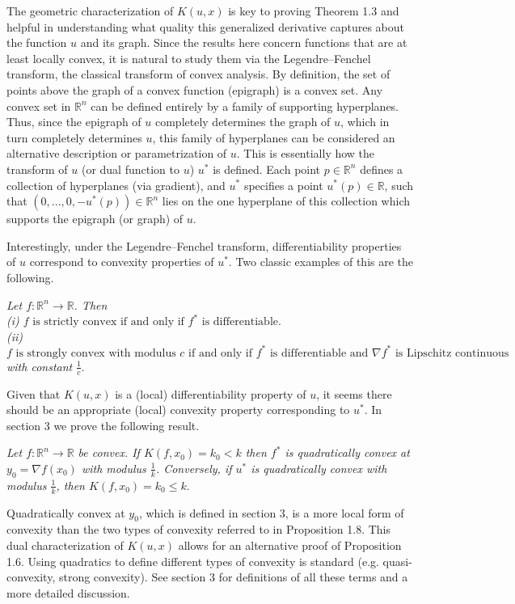 \documentclass[10pt]{article}
\newenvironment{theorem}[2][Theorem]{\begin{trivlist}
\item[\hskip \labelsep {\bfseries #1}\hskip \labelsep {\bfseries #2.}]}{\end{trivlist}}
\newenvironment{proposition}[2][Proposition]{\begin{trivlist}
\item[\hskip \labelsep {\bfseries #1}\hskip \labelsep {\bfseries #2.}]}{\end{trivlist}}
\begin{document}
The geometric characterization of $K(u,x)$ is key to proving Theorem 1.3 and helpful in understanding what quality this generalized derivative captures about the function $u$ and its graph. Since the results here concern functions that are at least locally convex, it is natural to study them via the Legendre--Fenchel transform, the classical transform of convex analysis. By definition, the set of points above the graph of a convex function (epigraph) is a convex set. Any convex set in $\mathbb{R}^n$ can be defined entirely by a family of supporting hyperplanes. Thus, since the epigraph of $u$ completely determines the graph of $u$, which in turn completely determines $u$, this family of hyperplanes can be considered an alternative description or parametrization of $u$. This is essentially how the transform of $u$ (or dual function to $u$) $u^*$ is defined. Each point $p\in \mathbb{R}^n$ defines a collection of hyperplanes (via gradient), and $u^*$ specifies a point $u^*(p)\in\mathbb{R}$, such that $(0,...,0,-u^*(p))\in \mathbb{R}^n$ lies on the one hyperplane of this collection which supports the epigraph (or graph) of $u$.

Interestingly, under the Legendre--Fenchel transform, differentiability properties of $u$ correspond to convexity properties of $u^*$. Two classic examples of this are the following.
\begin{proposition}{1.8}
\textit{Let $f:\mathbb{R}^n\rightarrow \mathbb{R}$. Then}\\
\textit{(i) $f \text{ is strictly convex if and only if } f^* \text{ is differentiable} .$}\\
\textit{(ii) $f \text{ is strongly convex with modulus } c \text{ if and only if } f^* \text{ is differentiable and }  \nabla f^* \text{ is Lipschitz continuous }$}\\  \textit{with constant} $\frac{1}{c}.$
\end{proposition}
Given that $K(u,x)$ is a (local) differentiability property of $u$, it seems there should be an appropriate (local) convexity property corresponding to $u^*$. In section 3 we prove the following result.
\begin{theorem}{1.9}
\textit{Let $f:\mathbb{R}^n \rightarrow \mathbb{R}$ be convex. If $K(f,x_0)=k_0<k$ then $f^*$ is quadratically convex at $y_0=\nabla f(x_0)$ with modulus $\frac{1}{k}$. Conversely, if $u^*$ is quadratically convex with modulus $\frac 1k$, then $K(f,x_0)=k_0\leq k$}.
\end{theorem}
Quadratically convex at $y_0$, which is defined in section 3, is a more local form of convexity than the two types of convexity referred to in Proposition 1.8. This dual characterization of $K(u,x)$ allows for an alternative proof of Proposition 1.6. Using quadratics to define different types of convexity is standard (e.g. quasi-convexity, strong convexity). See section 3 for definitions of all these terms and a more detailed discussion.
\end{document}
